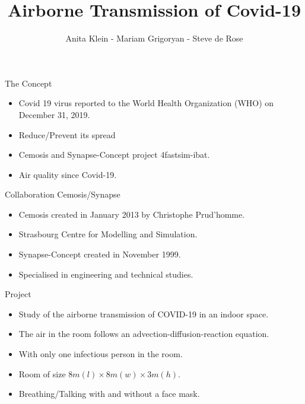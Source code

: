 \documentclass[10pt]{beamer}
\author{Anita Klein - Mariam Grigoryan - Steve de Rose}
\title{Airborne Transmission of Covid-19}
\date{}
\begin{document}
    
\begin{frame}
    \maketitle
\end{frame}

\begin{frame}{The Concept}
    \begin{itemize}
        \item Covid 19 virus reported to the World Health Organization (WHO) on December 31, 2019. 
        \item Reduce/Prevent its spread
        \item Cemosis and Synapse-Concept project 4fastsim-ibat. 
        \item Air quality since Covid-19.
    \end{itemize}
\end{frame}

\begin{frame}{Collaboration Cemosis/Synapse}
    \begin{itemize}
        \item Cemosis created in January 2013 by Christophe Prud’homme. 
        \item Strasbourg Centre for Modelling and Simulation.
        \item Synapse-Concept created in November 1999.
        \item Specialised in engineering and technical studies.
    \end{itemize}
\end{frame}

\begin{frame}{Project}
    \begin{itemize}
        \item Study of the airborne transmission of COVID-19 in an indoor space.
        \item The air in the room follows an advection-diffusion-reaction equation.
        \item With only one infectious person in the room.
        \item Room of size $8m(l)\times 8m(w) \times 3m(h)$.
        \item Breathing/Talking with and without a face mask.
    \end{itemize}
\end{frame}
\end{document}
